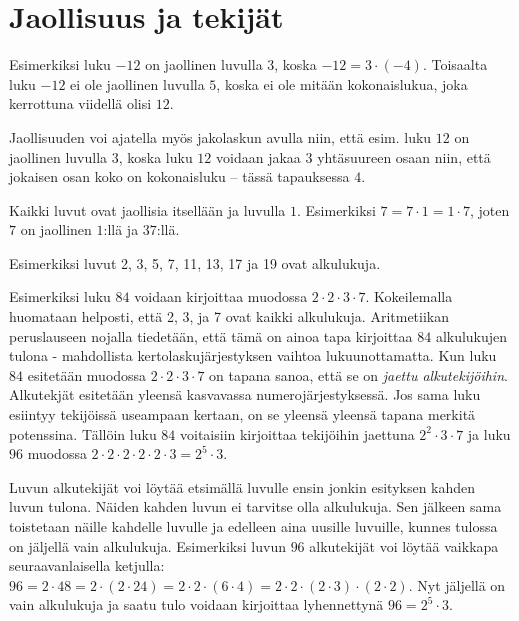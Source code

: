 \section{Jaollisuus ja tekijät}


Esimerkiksi luku $-12$ on jaollinen luvulla $3$, koska $-12=3\cdot (-4)$. Toisaalta luku $-12$ ei ole jaollinen luvulla $5$, koska ei ole mitään kokonaislukua, joka kerrottuna viidellä olisi $12$.

Jaollisuuden voi ajatella myös jakolaskun avulla niin, että esim. luku $12$ on jaollinen luvulla $3$, koska luku $12$ voidaan jakaa $3$ yhtäsuureen osaan niin, että jokaisen osan koko on kokonaisluku -- tässä tapauksessa $4$.

Kaikki luvut ovat jaollisia itsellään ja luvulla $1$. Esimerkiksi $7=7 \cdot 1=1 \cdot 7$, joten $7$ on jaollinen $1$:llä ja $37$:llä.


Esimerkiksi luvut 2, 3, 5, 7, 11, 13, 17 ja 19 ovat alkulukuja. 


Esimerkiksi luku $84$ voidaan kirjoittaa muodossa $2\cdot 2\cdot 3\cdot 7$. Kokeilemalla huomataan helposti, että 2, 3, ja 7 ovat kaikki alkulukuja. Aritmetiikan peruslauseen nojalla tiedetään, että tämä on ainoa tapa kirjoittaa $84$ alkulukujen tulona - mahdollista kertolaskujärjestyksen vaihtoa lukuunottamatta. Kun luku $84$ esitetään muodossa $2\cdot 2\cdot 3\cdot 7$ on tapana sanoa, että se on \emph{jaettu alkutekijöihin}. Alkutekjät esitetään yleensä kasvavassa numerojärjestyksessä. Jos sama luku esiintyy tekijöissä useampaan kertaan, on se yleensä yleensä tapana merkitä potenssina. Tällöin luku $84$ voitaisiin kirjoittaa tekijöihin jaettuna $2^2\cdot 3\cdot 7$ ja luku $96$ muodossa $2\cdot 2\cdot 2\cdot 2\cdot 2\cdot 3=2^5\cdot 3$.

Luvun alkutekijät voi löytää etsimällä luvulle ensin jonkin esityksen kahden luvun tulona. Näiden kahden luvun ei tarvitse olla alkulukuja. Sen jälkeen sama toistetaan näille kahdelle luvulle ja edelleen aina uusille luvuille, kunnes tulossa on jäljellä vain alkulukuja. Esimerkiksi luvun $96$ alkutekijät voi löytää vaikkapa seuraavanlaisella ketjulla: $96 = 2 \cdot 48 = 2 \cdot (2 \cdot 24) = 2 \cdot 2 \cdot (6 \cdot 4) = 2 \cdot 2 \cdot (2 \cdot 3) \cdot (2 \cdot 2)$. Nyt jäljellä on vain alkulukuja ja saatu tulo voidaan kirjoittaa lyhennettynä $96 = 2^5 \cdot 3$.

